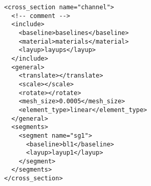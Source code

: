 \documentclass{article}
\begin{document}
\begin{lstlisting}[language=myxml, caption={Channel}]
<cross_section name="channel">
  <!-- comment -->
  <include>
    <baseline>baselines</baseline>
    <material>materials</material>
    <layup>layups</layup>
  </include>
  <general>
    <translate></translate>
    <scale></scale>
    <rotate></rotate>
    <mesh_size>0.0005</mesh_size>
    <element_type>linear</element_type>
  </general>
  <segments>
    <segment name="sg1">
      <baseline>bl1</baseline>
      <layup>layup1</layup>
    </segment>
  </segments>
</cross_section>
\end{lstlisting}
\end{document}
